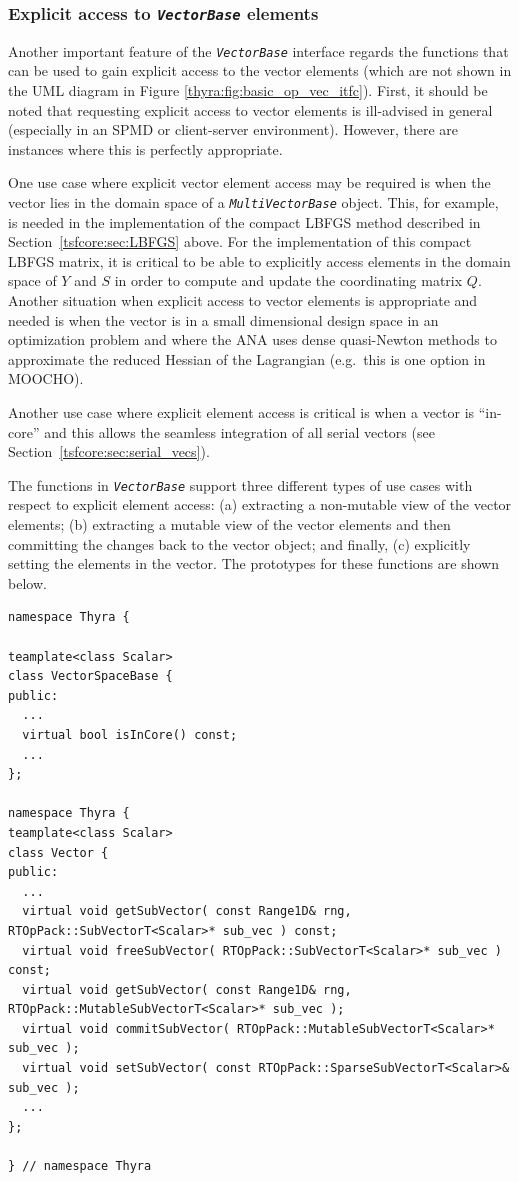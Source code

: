 \documentclass[pdf,ps2pdf,11pt]{SANDreport}
\begin{document}
%
\subsubsection{Explicit access to {}\texttt{\textit{Vector\-Base}} elements}
\label{tsfcore:sec:explicit_vec_access}
%

Another important feature of the {}\texttt{\textit{Vector\-Base}} interface
regards the functions that can be used to gain explicit access to the
vector elements (which are not shown in the UML diagram in Figure
{}\ref{thyra:fig:basic_op_vec_itfc}).  First, it should be noted that
requesting explicit access to vector elements is ill-advised in
general (especially in an SPMD or client-server environment).
However, there are instances where this is perfectly appropriate.

One use case where explicit vector element access may be required is when the
vector lies in the domain space of a {}\texttt{\textit{Multi\-Vector\-Base}}
object.  This, for example, is needed in the implementation of the compact
LBFGS method described in Section~\ref{tsfcore:sec:LBFGS} above.  For the
implementation of this compact LBFGS matrix, it is critical to be able to
explicitly access elements in the domain space of $Y$ and $S$ in order to
compute and update the coordinating matrix $Q$.  Another situation when
explicit access to vector elements is appropriate and needed is when the
vector is in a small dimensional design space in an optimization problem and
where the ANA uses dense quasi-Newton methods to approximate the reduced
Hessian of the Lagrangian (e.g.~this is one option in MOOCHO).

Another use case where explicit element access is critical is when a vector is
``in-core'' and this allows the seamless integration of all serial vectors
(see Section~\ref{tsfcore:sec:serial_vecs}).

The functions in {}\texttt{\textit{Vector\-Base}} support three different
types of use cases with respect to explicit element access: (a)
extracting a non-mutable view of the vector elements; (b) extracting a
mutable view of the vector elements and then committing the changes
back to the vector object; and finally, (c) explicitly setting the
elements in the vector.  The prototypes for these functions are shown
below.

{\scriptsize\begin{verbatim}
namespace Thyra {

teamplate<class Scalar>
class VectorSpaceBase {
public:
  ...
  virtual bool isInCore() const;
  ...
};

namespace Thyra {
teamplate<class Scalar>
class Vector {
public:
  ...
  virtual void getSubVector( const Range1D& rng, RTOpPack::SubVectorT<Scalar>* sub_vec ) const;
  virtual void freeSubVector( RTOpPack::SubVectorT<Scalar>* sub_vec ) const;
  virtual void getSubVector( const Range1D& rng, RTOpPack::MutableSubVectorT<Scalar>* sub_vec );
  virtual void commitSubVector( RTOpPack::MutableSubVectorT<Scalar>* sub_vec );
  virtual void setSubVector( const RTOpPack::SparseSubVectorT<Scalar>& sub_vec );
  ...
};

} // namespace Thyra
\end{verbatim}}
\end{document}
